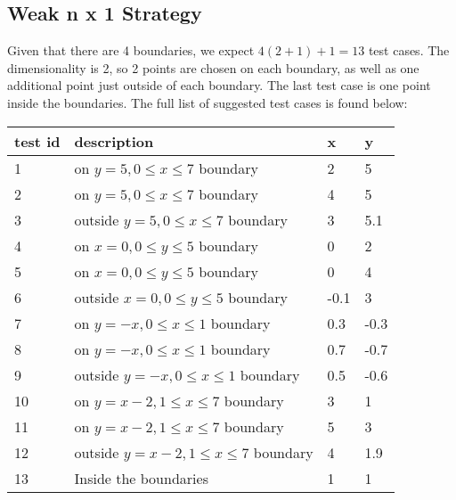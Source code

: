 \documentclass[letterpaper]{article}
\begin{document}
\subsection{Weak n x 1 Strategy}
Given that there are 4 boundaries, we expect $4(2+1) +1 = 13$ test cases.
The dimensionality is 2, so 2 points are chosen on each boundary, as well
as one additional point just outside of each boundary. The last test case
is one point inside the boundaries. The full list of suggested test cases
is found below:
\begin{adjustbox}{center}
	\begin{tabular}{llll}
		test id & description                              & x    & y    \\ \hline
		1       & on $y=5, 0\leq x\leq 7$ boundary         & 2    & 5    \\
		2       & on $y=5, 0\leq x\leq 7$ boundary         & 4    & 5    \\
		3       & outside $y=5, 0\leq x\leq 7$ boundary    & 3    & 5.1  \\
		4       & on $x=0, 0\leq y \leq 5$ boundary        & 0    & 2    \\
		5       & on $x=0, 0\leq y \leq 5$ boundary        & 0    & 4    \\
		6       & outside $x=0, 0\leq y \leq 5$ boundary   & -0.1 & 3    \\
		7       & on $y=-x, 0\leq x\leq 1$ boundary        & 0.3  & -0.3 \\
		8       & on $y=-x, 0\leq x\leq 1$ boundary        & 0.7  & -0.7 \\
		9       & outside  $y=-x, 0\leq x\leq 1$ boundary  & 0.5  & -0.6 \\
		10      & on $y=x-2, 1\leq x \leq 7$ boundary      & 3    & 1    \\
		11      & on $y=x-2, 1\leq x \leq 7$ boundary      & 5    & 3    \\
		12      & outside $y=x-2, 1\leq x \leq 7$ boundary & 4    & 1.9  \\
		13      & Inside the boundaries                    & 1    & 1    \\
	\end{tabular}
\end{adjustbox}
\end{document}
